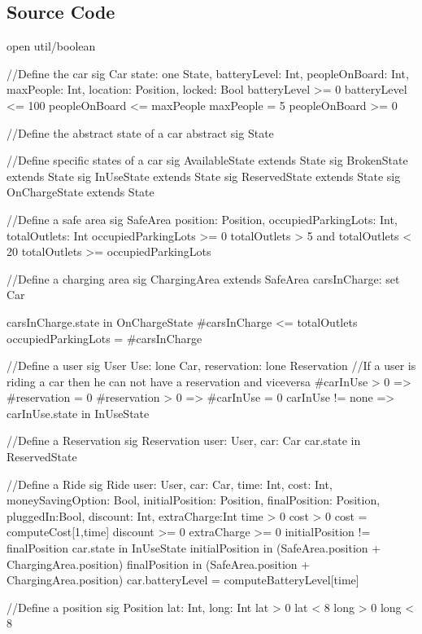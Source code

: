 \documentclass[11pt,a4paper]{report}
\begin{document}
\subsection{Source Code}
\begin{alloyCode}
open util/boolean

//Define the car
sig Car{
	state: one State,
	batteryLevel: Int,
	peopleOnBoard: Int,
	maxPeople: Int,
	location: Position,
	locked: Bool
}
{
	batteryLevel >= 0
	batteryLevel <= 100
	peopleOnBoard <= maxPeople
	maxPeople = 5
	peopleOnBoard >= 0
}

//Define the abstract state of a car
abstract sig State{ }

//Define specific states of a car
sig AvailableState extends State{ }
sig BrokenState extends State{ }
sig InUseState extends State{ }
sig ReservedState extends State{ }
sig OnChargeState extends State{ }

//Define a safe area
sig SafeArea{
	position: Position,
	occupiedParkingLots: Int,
	totalOutlets: Int
}	
{
	occupiedParkingLots >= 0
	totalOutlets > 5 and totalOutlets < 20
	totalOutlets >= occupiedParkingLots
}

//Define a charging area
sig ChargingArea extends SafeArea{
	carsInCharge: set Car
} 
{
	carsInCharge.state in OnChargeState
	#carsInCharge <= totalOutlets
	occupiedParkingLots = #carsInCharge

}

//Define a user
sig User{
	Use: lone Car,
	reservation: lone Reservation
}
{
	//If a user is riding a car then he can not have a reservation and viceversa
	#carInUse > 0 => #reservation = 0	
	#reservation > 0 => #carInUse = 0 
	carInUse != none => carInUse.state in InUseState
}

//Define a Reservation
sig Reservation{
	user: User,
	car: Car
}
{
	car.state in ReservedState
}

//Define a Ride
sig Ride{
	user: User,
	car: Car,
	time: Int, 
	cost: Int, 
	moneySavingOption: Bool, 
	initialPosition: Position,
	finalPosition: Position,
	pluggedIn:Bool,
	discount: Int,
	extraCharge:Int
}
{
	time > 0
	cost > 0
	cost = computeCost[1,time]
	discount >= 0
	extraCharge >= 0
	initialPosition != finalPosition
	car.state in InUseState
	initialPosition in (SafeArea.position + ChargingArea.position)
	finalPosition in (SafeArea.position + ChargingArea.position)
	car.batteryLevel = computeBatteryLevel[time] 
}

//Define a position
sig Position{
	lat: Int,
	long: Int
} 
{
	lat > 0
	lat < 8 
	long > 0
	long < 8
}


\end{alloyCode}
\end{document}
